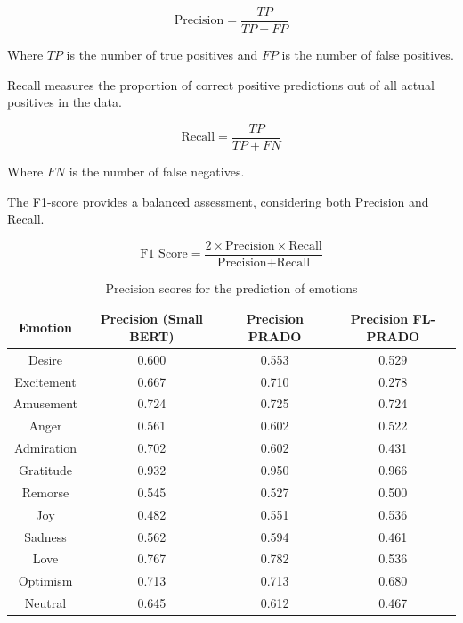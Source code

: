 \begin{equation}
  \text{Precision} = \frac{TP}{TP + FP}
  \label{eq:ch3_precision}
\end{equation}

\noindent Where $TP$ is the number of true positives and $FP$ is the number of false positives.

Recall measures the proportion of correct positive predictions out of all actual positives in the data.

\begin{equation}
  \text{Recall} = \frac{TP}{TP + FN}
  \label{eq:ch3_recall}
\end{equation}

\noindent Where $FN$ is the number of false negatives.

The F1-score provides a balanced assessment, considering both Precision and Recall.

\begin{equation}
  \text{F1 Score} = \frac{2 \times \text{Precision} \times \text{Recall}}{\text{Precision} + \text{Recall}}
  \label{eq:ch3_f1}
\end{equation}

\begin{table}[htbp]
  \centering
  \caption{Precision scores for the prediction of emotions}
  \label{tab:ch3_t1}
  \begin{tabular}{|c|c|c|c|}
    \hline
    Emotion & Precision (Small BERT) & Precision PRADO & Precision  FL-PRADO \\
    \hline
    Desire & 0.600 & 0.553 & 0.529 \\
    \hline
    Excitement & 0.667 & 0.710 & 0.278 \\
    \hline
    Amusement & 0.724 & 0.725 & 0.724 \\
    \hline
    Anger & 0.561 & 0.602 & 0.522 \\
    \hline
    Admiration & 0.702 & 0.602 & 0.431 \\
    \hline
    Gratitude & 0.932 & 0.950 & 0.966 \\
    \hline
    Remorse & 0.545 & 0.527 & 0.500 \\
    \hline
    Joy & 0.482 & 0.551 & 0.536 \\
    \hline
    Sadness & 0.562 & 0.594 & 0.461 \\
    \hline
    Love & 0.767 & 0.782 & 0.536 \\
    \hline
    Optimism & 0.713 & 0.713 & 0.680 \\
    \hline
    Neutral & 0.645 & 0.612 & 0.467 \\
    \hline
  \end{tabular}
\end{table}

